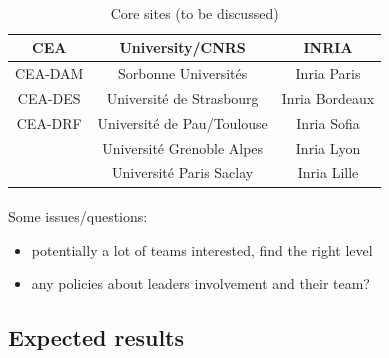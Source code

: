 \begin{frame}[fragile=singleslide]{\insertsectionhead}
  \framesubtitle{\insertsubsectionhead}
  \begin{table}[H]
    \centering
    \caption{Core sites (to be discussed)}
    \begin{tabular}{@{} ccc @{}}
      \toprule
      \textbf{CEA} & \textbf{University/CNRS}  & \textbf{INRIA} \\
      \midrule
      CEA-DAM & Sorbonne Universités  & Inria Paris\\
      CEA-DES &  Université de Strasbourg &  Inria Bordeaux\\
      CEA-DRF & Université de Pau/Toulouse & Inria Sofia\\
      & Université Grenoble Alpes & Inria Lyon\\
      & Université Paris Saclay	& Inria Lille \\
      \bottomrule
    \end{tabular}
  \end{table}

\end{frame}
\begin{frame}[fragile=singleslide]{\insertsectionhead}
  \framesubtitle{\insertsubsectionhead}
  
  Some issues/questions:
  \begin{itemize}
      \item potentially a lot of teams interested, find the right level
      \item any policies about leaders  involvement  and their team?
  \end{itemize}
  
\end{frame}
\subsection{Expected results}

